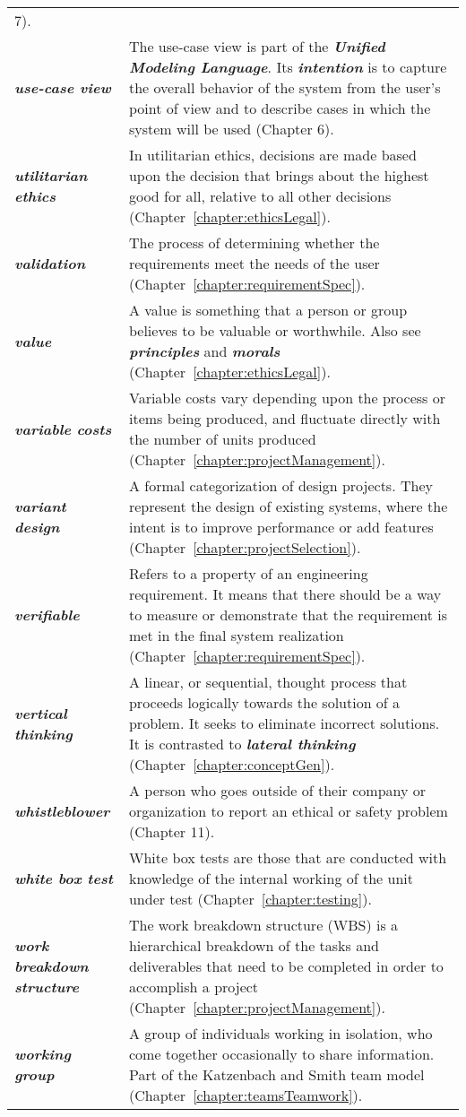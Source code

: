 \begin{longtable} { p{4cm} p{11cm}}
7). \\
\emph{\textbf{use-case view}} & The use-case view is part of the
\emph{\textbf{Unified Modeling Language}}. Its \emph{\textbf{intention}}
is to capture the overall behavior of the system from the user's point
of view and to describe cases in which the system will be used (Chapter
6). \\
\emph{\textbf{utilitarian ethics}} & In utilitarian ethics, decisions
are made based upon the decision that brings about the highest good for
all, relative to all other decisions (Chapter~\ref{chapter:ethicsLegal}). \\
\emph{\textbf{validation}} & The process of determining whether the
requirements meet the needs of the user (Chapter~\ref{chapter:requirementSpec}). \\
\emph{\textbf{value}} & A value is something that a person or group
believes to be valuable or worthwhile. Also see
\emph{\textbf{principles}} and \emph{\textbf{morals}} (Chapter~\ref{chapter:ethicsLegal}). \\
\emph{\textbf{variable costs}} & Variable costs vary depending upon the
process or items being produced, and fluctuate directly with the number
of units produced (Chapter~\ref{chapter:projectManagement}). \\
\emph{\textbf{variant design}} & A formal categorization of design
projects. They represent the design of existing systems, where the
intent is to improve performance or add features (Chapter~\ref{chapter:projectSelection}). \\
\emph{\textbf{verifiable}} & Refers to a property of an engineering
requirement. It means that there should be a way to measure or
demonstrate that the requirement is met in the final system realization
(Chapter~\ref{chapter:requirementSpec}). \\
\emph{\textbf{vertical thinking}} & A linear, or sequential, thought
process that proceeds logically towards the solution of a problem. It
seeks to eliminate incorrect solutions. It is contrasted to
\emph{\textbf{lateral thinking}} (Chapter~\ref{chapter:conceptGen}). \\
\emph{\textbf{whistleblower}} & A person who goes outside of their
company or organization to report an ethical or safety problem (Chapter
11). \\
\emph{\textbf{white box test}} & White box tests are those that are
conducted with knowledge of the internal working of the unit under test
(Chapter~\ref{chapter:testing}). \\
\emph{\textbf{work breakdown structure}} & The work breakdown structure
(WBS) is a hierarchical breakdown of the tasks and deliverables that
need to be completed in order to accomplish a project (Chapter~\ref{chapter:projectManagement}). \\
\emph{\textbf{working group}} & A group of individuals working in
isolation, who come together occasionally to share information. Part of
the Katzenbach and Smith team model (Chapter~\ref{chapter:teamsTeamwork}). \\
\end{longtable}

